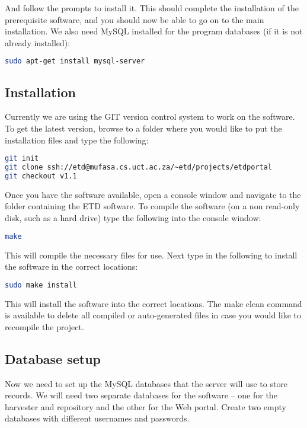 \documentclass[a4paper,11pt]{article}
\begin{document}
And follow the prompts to install it. This should complete the installation of the prerequisite software, and you should now be able to go on to the main installation. We also need MySQL installed for the program databases (if it is not already installed): 

\begin{lstlisting}[language=bash]
 sudo apt-get install mysql-server
\end{lstlisting}

\subsection{Installation}

Currently we are using the GIT version control system to work on the software. To get the latest version, browse to a folder where you would like to put the installation files and type the following:

\begin{lstlisting}[language=bash]
git init 
git clone ssh://etd@mufasa.cs.uct.ac.za/~etd/projects/etdportal 
git checkout v1.1
\end{lstlisting}

Once you have the software available, open a console window and navigate to the folder containing the ETD software. To compile the software (on a non read-only disk, such as a hard drive) type the following into the console window: 

\begin{lstlisting}[language=bash]
 make
\end{lstlisting}

This will compile the necessary files for use. Next type in the following to install the software in the correct locations: 

\begin{lstlisting}[language=bash]
 sudo make install
\end{lstlisting}

This will install the software into the correct locations. The make clean command is available to delete all compiled or auto-generated files in case you would like to recompile the project.

\subsection{Database setup}

Now we need to set up the MySQL databases that the server will use to store records. We will need two separate databases for the software – one for the harvester and repository and the other for the Web portal. Create two empty databases with different usernames and passwords. 
\end{document}
